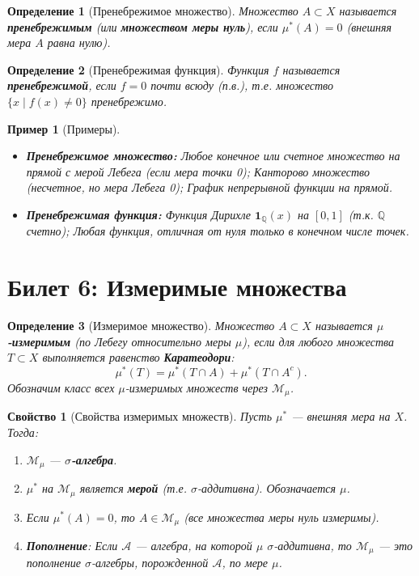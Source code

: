 \documentclass[a4paper, 12pt]{article}
\newtheorem{definition}{Определение}
\newtheorem{example}{Пример}
\newtheorem{property}{Свойство}
\newcommand{\Q}{\mathbb{Q}}
\newcommand{\1}{\mathbf{1}}
\begin{document}
\begin{definition}[Пренебрежимое множество]
    Множество $A \subset X$ называется \textbf{пренебрежимым} (или \textbf{множеством меры нуль}), если $\mu^*(A) = 0$ (внешняя мера $A$ равна нулю).
\end{definition}

\begin{definition}[Пренебрежимая функция]
    Функция $f$ называется \textbf{пренебрежимой}, если $f = 0$ почти всюду (п.в.), т.е. множество $\{x \mid f(x) \neq 0\}$ пренебрежимо.
\end{definition}

\begin{example}[Примеры]
    \hfill
    \begin{itemize}
        \item \textbf{Пренебрежимое множество:} Любое конечное или счетное множество на прямой с мерой Лебега (если мера точки 0); Канторово множество (несчетное, но мера Лебега 0); График непрерывной функции на прямой.
        \item \textbf{Пренебрежимая функция:} Функция Дирихле $\1_{\Q}(x)$ на $[0,1]$ (т.к. $\Q$ счетно); Любая функция, отличная от нуля только в конечном числе точек.
    \end{itemize}
\end{example}

\section*{Билет 6: Измеримые множества}
\begin{definition}[Измеримое множество]
    Множество $A \subset X$ называется \textbf{$\mu$-измеримым} (по Лебегу относительно меры $\mu$), если для любого множества $T \subset X$ выполняется равенство \textbf{Каратеодори}:
    \[
    \mu^*(T) = \mu^*(T \cap A) + \mu^*(T \cap A^c).
    \]
    Обозначим класс всех $\mu$-измеримых множеств через $\mathcal{M}_{\mu}$.
\end{definition}

\begin{property}[Свойства измеримых множеств]
    Пусть $\mu^*$ — внешняя мера на $X$. Тогда:
    \begin{enumerate}[label=(\arabic*)]
        \item $\mathcal{M}_{\mu}$ — \textbf{$\sigma$-алгебра}.
        \item $\mu^*$ на $\mathcal{M}_{\mu}$ является \textbf{мерой} (т.е. $\sigma$-аддитивна). Обозначается $\mu$.
        \item Если $\mu^*(A) = 0$, то $A \in \mathcal{M}_{\mu}$ (все множества меры нуль измеримы).
        \item \textbf{Пополнение}: Если $\mathcal{A}$ — алгебра, на которой $\mu$ $\sigma$-аддитивна, то $\mathcal{M}_{\mu}$ — это пополнение $\sigma$-алгебры, порожденной $\mathcal{A}$, по мере $\mu$.
    \end{enumerate}
\end{property}
\end{document}
